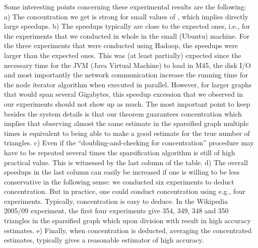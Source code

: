 \documentclass{llncs}
\begin{document}
Some interesting points concerning these experimental results are the following:
a) The concentration we get is strong for small values of , which implies directly large speedups.
b) The speedups typically are close to the expected ones, i.e.,  for the experiments
that we conducted in whole in the small (Ubuntu) machine. For the three experiments that were conducted
using Hadoop, the speedups were larger than the expected ones. This was (at least partially) expected since the necessary time for the JVM
(Java Virtual Machine) to load in M45, the disk I/O and most importantly the network communication
increase the running time for the node iterator algorithm when executed in parallel. 
However, for larger graphs that would span several Gigabytes, 
this speedup excession that we observed in our experiments should not show up as much.
The most important point to keep besides the system details is that our theorem guarantees concentration 
which implies that observing almost the same estimate in the sparsified graph multiple times
is equivalent to being able to make a good estimate for the true number of triangles. 
c) Even if the ``doubling-and-checking for concentration'' procedure may have to be repeated several times
the sparsification algorithm is still of high practical value. This is witnessed by the last column 
of the table. 
d) The overall speedups in the last column can easily be increased if one is willing to be less conservative
in the following sense: we conducted six experiments to deduct concentration. But in practice, one could conduct 
concentration using e.g., four experiments. Typically, concentration is easy to deduce. In the Wikipedia 2005/09
experiment, the first four experiments give 354, 349, 348 and 350 triangles in the sparsified graph which 
upon division with  result in high accuracy estimates.
e) Finally, when concentration is deducted, averaging the concentrated estimates, typically gives a reasonable
estimator of high accuracy.
\end{document}
